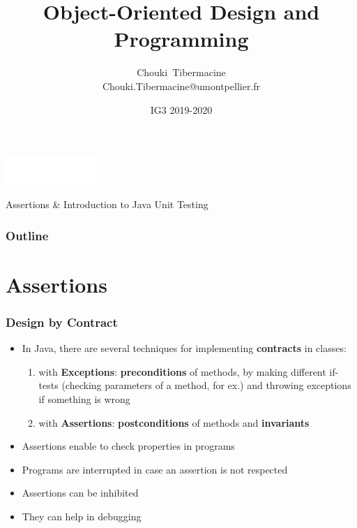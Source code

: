 \documentclass{beamer}
\title[Java]{\Large{Object-Oriented Design and Programming}}
\author[C. Tibermacine]{\large{Chouki~Tibermacine}\\
  \small{Chouki.Tibermacine@umontpellier.fr}
}
\date{\tiny{IG3 2019-2020}}
\begin{document}
\begin{frame}
\titlepage
\begin{flushright}
\includegraphics[width=3.5cm]{figs/polytech.png}
\end{flushright}
\end{frame}

\begin{frame}
  \huge{Assertions \& Introduction to Java Unit Testing}
\end{frame}


    \begin{frame}
      \frametitle{Outline}
      \tableofcontents
    \end{frame}

\section{Assertions}
\begin{frame}
\frametitle{Design by Contract}
\begin{itemize}
\item In Java, there are several techniques for implementing \textbf{contracts} in classes:
  \begin{enumerate}
  \item with \textbf{Exceptions}: \textbf{preconditions} of methods,
    by making different if-tests (checking parameters of a method, for
    ex.)  and throwing exceptions if something is wrong
  \item with \textbf{Assertions}: \textbf{postconditions} of methods
    and \textbf{invariants}
  \end{enumerate}
\item Assertions enable to check properties in programs
\item Programs are interrupted in case an assertion is not respected
\item Assertions can be inhibited
\item They can help in debugging
\end{itemize}
\end{frame}
\end{document}
